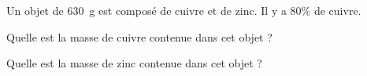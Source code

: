 Un objet de 630~g est composé de cuivre et de zinc. Il y a 80\%
de cuivre.
\begin{myenumerate}
\item Quelle est la masse de cuivre contenue dans cet objet ?
\item Quelle est la masse de zinc contenue dans cet objet ?
\end{myenumerate}